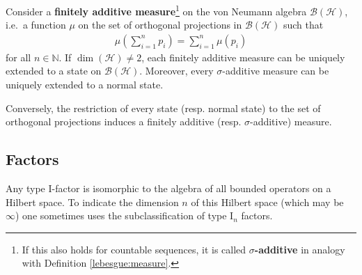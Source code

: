 

    \begin{theorem}[Gleason]
        Consider a \textbf{finitely additive measure}\footnote{If this also holds for countable sequences, it is called \textbf{$\sigma$-additive} in analogy with Definition \ref{lebesgue:measure}.} on the von Neumann algebra $\mathcal{B}(\mathcal{H})$, i.e.~a function $\mu$ on the set of orthogonal projections in $\mathcal{B}(\mathcal{H})$ such that
        \begin{gather}
            \mu\left(\sum_{i=1}^np_i\right) = \sum_{i=1}^n\mu(p_i)
        \end{gather}
        for all $n\in\mathbb{N}$. If $\dim(\mathcal{H})\neq2$, each finitely additive measure can be uniquely extended to a state on $\mathcal{B}(\mathcal{H})$. Moreover, every $\sigma$-additive measure can be uniquely extended to a normal state.

        Conversely, the restriction of every state (resp. normal state) to the set of orthogonal projections induces a finitely additive (resp. $\sigma$-additive) measure.
    \end{theorem}

\subsection{Factors}


    \begin{property}
        Any type $\mathrm{I}$-factor is isomorphic to the algebra of all bounded operators on a Hilbert space. To indicate the dimension $n$ of this Hilbert space (which may be $\infty$) one sometimes uses the subclassification of type $\mathrm{I}_n$ factors.
    \end{property}

